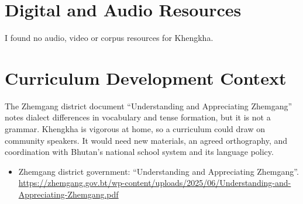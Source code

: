 \documentclass[12pt]{article}
\begin{document}
\section{Digital and Audio Resources}
I found no audio, video or corpus resources for Khengkha.

\section{Curriculum Development Context}
The Zhemgang district document ``Understanding and Appreciating Zhemgang'' notes dialect differences in vocabulary and tense formation, but it is not a grammar. Khengkha is vigorous at home, so a curriculum could draw on community speakers. It would need new materials, an agreed orthography, and coordination with Bhutan's national school system and its language policy.

\begin{itemize}
\item Zhemgang district government: ``Understanding and Appreciating Zhemgang''. \url{https://zhemgang.gov.bt/wp-content/uploads/2025/06/Understanding-and-Appreciating-Zhemgang.pdf}
\end{itemize}
\end{document}
